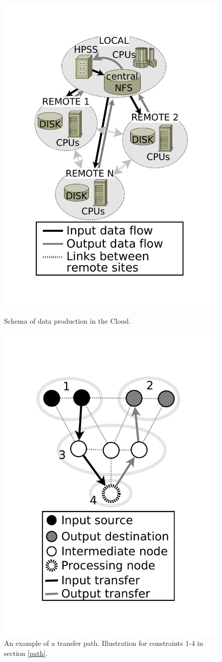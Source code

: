\documentclass[english]{ddny}
\begin{document}
\begin{figure}[h]
\begin{minipage}{.49\textwidth}
\centering
    \includegraphics[trim =30mm 30mm 30mm 30mm ,clip, width=.5\textwidth]{pic/Data_production_general_bw2.pdf}
    \caption{Schema of data production in the Cloud.}
    \label{fig:simulated grig}
\end{minipage}\hspace{1pc}%
\begin{minipage}{.49\textwidth}
\centering
    \includegraphics [trim =30mm 35mm 30mm 40mm ,clip, width=.49\textwidth]{pic/link_selection_bw3.pdf}	
    \caption{An example of a transfer path. Illustration for constraints 1-4 in section \ref{path}.  }
    \label{fig:path}
\end{minipage} 
\end{figure}
\end{document}
